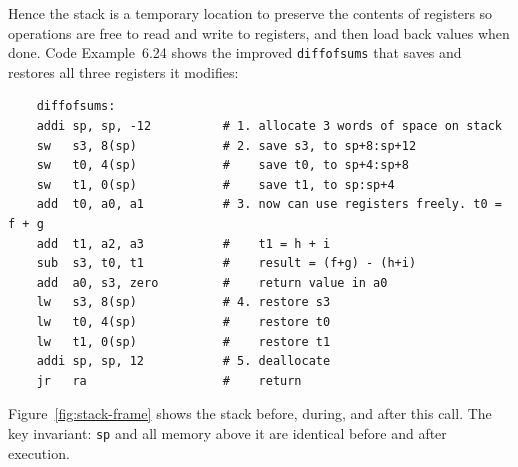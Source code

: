 \documentclass[9pt, a4paper]{extarticle}
\begin{document}
Hence the stack is a temporary location to preserve the contents of registers so operations are free to read and write to registers, and then load back values when done. Code Example~6.24 shows the improved \texttt{diffofsums} that saves and restores all three registers it modifies:

\begin{verbatim}
    diffofsums:
    addi sp, sp, -12          # 1. allocate 3 words of space on stack
    sw   s3, 8(sp)            # 2. save s3, to sp+8:sp+12
    sw   t0, 4(sp)            #    save t0, to sp+4:sp+8
    sw   t1, 0(sp)            #    save t1, to sp:sp+4
    add  t0, a0, a1           # 3. now can use registers freely. t0 = f + g
    add  t1, a2, a3           #    t1 = h + i
    sub  s3, t0, t1           #    result = (f+g) - (h+i)
    add  a0, s3, zero         #    return value in a0
    lw   s3, 8(sp)            # 4. restore s3
    lw   t0, 4(sp)            #    restore t0
    lw   t1, 0(sp)            #    restore t1
    addi sp, sp, 12           # 5. deallocate
    jr   ra                   #    return
\end{verbatim}

Figure~\ref{fig:stack-frame} shows the stack before, during, and after this call. The key invariant: \texttt{sp} and all memory above it are identical before and after execution.
\end{document}
